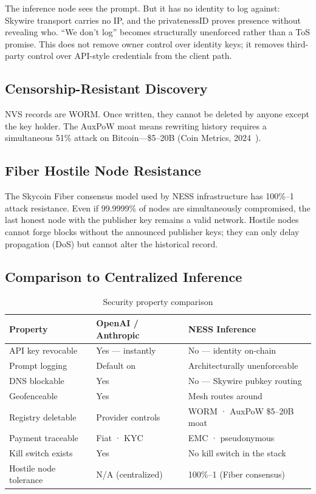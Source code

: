 \documentclass[11pt,a4paper]{article}
\begin{document}
The inference node sees the prompt. But it has no identity to log against: Skywire transport carries no IP, and the privatenessID proves presence without revealing who. ``We don't log'' becomes structurally unenforced rather than a ToS promise. This does not remove owner control over identity keys; it removes third-party control over API-style credentials from the client path.

\subsection{Censorship-Resistant Discovery}

NVS records are WORM. Once written, they cannot be deleted by anyone except the key holder. The AuxPoW moat means rewriting history requires a simultaneous 51\% attack on Bitcoin—\$5--20B (Coin Metrics, 2024~\cite{coinmetrics2024}).

\subsection{Fiber Hostile Node Resistance}

The Skycoin Fiber consensus model used by NESS infrastructure has 100\%--1 attack resistance. Even if 99.9999\% of nodes are simultaneously compromised, the last honest node with the publisher key remains a valid network. Hostile nodes cannot forge blocks without the announced publisher keys; they can only delay propagation (DoS) but cannot alter the historical record.

\subsection{Comparison to Centralized Inference}

\begin{table}[h]
\centering
\caption{Security property comparison}
\label{tab:compare}
\begin{tabular}{@{}lll@{}}
\toprule
Property & OpenAI / Anthropic & NESS Inference \\
\midrule
API key revocable & Yes — instantly & No — identity on-chain \\
Prompt logging & Default on & Architecturally unenforceable \\
DNS blockable & Yes & No — Skywire pubkey routing \\
Geofenceable & Yes & Mesh routes around \\
Registry deletable & Provider controls & WORM · AuxPoW \$5--20B moat \\
Payment traceable & Fiat · KYC & EMC · pseudonymous \\
Kill switch exists & Yes & No kill switch in the stack \\
Hostile node tolerance & N/A (centralized) & 100\%--1 (Fiber consensus) \\
\bottomrule
\end{tabular}
\end{table}
\end{document}
